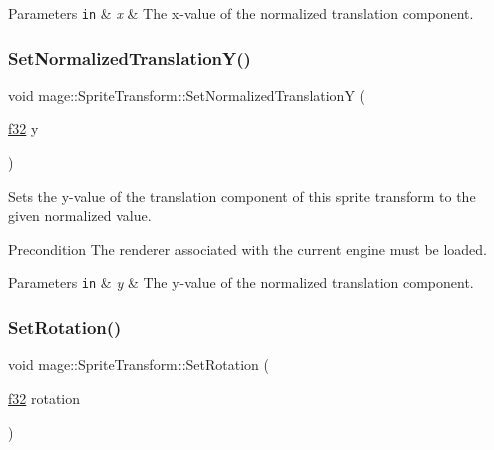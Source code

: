 \begin{DoxyParams}[1]{Parameters}
\mbox{\tt in}  & {\em x} & The x-\/value of the normalized translation component. \\
\hline
\end{DoxyParams}
\hypertarget{structmage_1_1_sprite_transform_a78bcdd2ddb2e67b200b3fbabf55adbb6}{}\label{structmage_1_1_sprite_transform_a78bcdd2ddb2e67b200b3fbabf55adbb6} 
\subsubsection{\texorpdfstring{Set\+Normalized\+Translation\+Y()}{SetNormalizedTranslationY()}}
{\footnotesize\ttfamily void mage\+::\+Sprite\+Transform\+::\+Set\+Normalized\+TranslationY (\begin{DoxyParamCaption}\item[{\hyperlink{namespacemage_a6a44ad388483959dc4dff9f2aef91431}{f32}}]{y }\end{DoxyParamCaption})}

Sets the y-\/value of the translation component of this sprite transform to the given normalized value.

\begin{DoxyPrecond}{Precondition}
The renderer associated with the current engine must be loaded. 
\end{DoxyPrecond}

\begin{DoxyParams}[1]{Parameters}
\mbox{\tt in}  & {\em y} & The y-\/value of the normalized translation component. \\
\hline
\end{DoxyParams}
\hypertarget{structmage_1_1_sprite_transform_af56c77372fcaf9fe186433d42b88b6a7}{}\label{structmage_1_1_sprite_transform_af56c77372fcaf9fe186433d42b88b6a7} 
\subsubsection{\texorpdfstring{Set\+Rotation()}{SetRotation()}}
{\footnotesize\ttfamily void mage\+::\+Sprite\+Transform\+::\+Set\+Rotation (\begin{DoxyParamCaption}\item[{\hyperlink{namespacemage_a6a44ad388483959dc4dff9f2aef91431}{f32}}]{rotation }\end{DoxyParamCaption})\hspace{0.3cm}{\ttfamily [noexcept]}}

